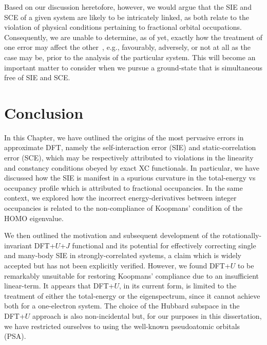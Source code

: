 {Based on our discussion heretofore, however, 
we would argue that the SIE and SCE of a given system 
are likely to be intricately linked, 
as both relate to the violation of physical conditions 
pertaining to fractional orbital occupations.
%
Consequently, 
we are unable to determine, as of yet, 
exactly how the treatment of one error may affect the 
other~\cite{doi:10.1021/cr200107z,doi:10.1080/00268976.2010.507227}, 
e.g., favourably, adversely, or not at all as the case may be, 
prior to the analysis of the particular system.
%
This will become an important 
matter to consider when we pursue a ground-state 
that is simultaneous free of SIE and SCE.


\section{Conclusion}
%

In this Chapter, 
we have outlined 
the origins of the most pervasive errors 
in approximate DFT, 
namely the self-interaction error (SIE) 
and static-correlation error (SCE), 
which may be respectively attributed 
to violations in the linearity and constancy conditions  
obeyed by exact XC functionals.
%
In particular, 
we have discussed how the SIE 
is manifest in a spurious 
curvature in the total-energy vs occupancy profile 
which is attributed to fractional occupancies.
%
%
In the same context, 
we explored how 
the incorrect energy-derivatives between integer occupancies 
is related to the 
non-compliance of Koopmans' condition 
of the HOMO eigenvalue.
%


We then outlined the motivation 
and subsequent development 
of the rotationally-invariant DFT+$U$+$J$ functional 
and its potential for effectively correcting 
single and many-body SIE 
in strongly-correlated systems, 
a claim which is widely accepted but 
has not been explicitly verified.
%
However, we found DFT+$U$ 
to be remarkably {unsuitable} for 
restoring Koopmans' compliance 
due to an {insufficient} linear-term.
%
{
It appears that DFT+$U$, 
in its current form, 
is limited to the treatment of either 
the total-energy or the eigenspectrum,
since it cannot achieve both for a one-electron system.}
%
The choice of the Hubbard subspace 
in the DFT+$U$ approach 
is also non-incidental but, 
for our purposes in this dissertation, 
we have restricted ourselves 
to using the well-known pseudoatomic orbitals (PSA).

}
